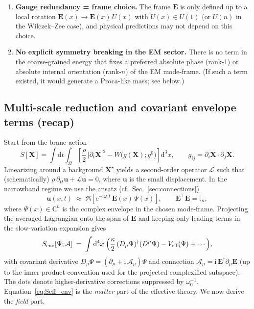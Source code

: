 \documentclass[11pt,a4paper]{article}
\newcommand{\C}{\mathbb{C}}
\providecommand{\dd}{\mathrm{d}}
\providecommand{\ii}{\mathrm{i}}
\providecommand{\e}{\mathrm{e}}
\newcommand{\X}{\mathbf{X}}                 %
\newcommand{\uvec}{\mathbf{u}}              %
\newcommand{\bbA}{\mathcal{A}}              %
\begin{document}
\begin{enumerate}
  \item \textbf{Gauge redundancy = frame choice.} The frame \(\mathbf{E}\) is only defined up to a local rotation
        \(\mathbf{E}(x)\to \mathbf{E}(x)\,U(x)\) with \(U(x)\in U(1)\) (or \(U(n)\) in the Wilczek--Zee case),
        and physical predictions may not depend on this choice.
  \item \textbf{No explicit symmetry breaking in the EM sector.} There is no term in the coarse-grained energy that fixes a preferred
        absolute phase (rank-1) or absolute internal orientation (rank-\(n\)) of the EM mode-frame. (If such a term existed, it would generate
        a Proca-like mass; see below.)
\end{enumerate}

\subsection{Multi-scale reduction and covariant envelope terms (recap)}
Start from the brane action
\[
S[\X]=\int \dd t \int_{\Omega}\!\left[\frac{\rho}{2}\,|\partial_t\X|^2 - W\!\big(g(\X);g^0\big)\right]\dd^3x,
\qquad g_{ij}=\partial_i\X\cdot\partial_j\X.
\]
Linearizing around a background \(\X^\star\) yields a second-order operator \(\mathcal{L}\) such that (schematically)
\(\rho\,\partial_{tt}\uvec + \mathcal{L}\uvec = 0\), where \(\uvec\) is the small displacement.
In the narrowband regime we use the ansatz (cf.~Sec.~\ref{sec:connections})
\begin{equation}
\uvec(x,t)\;\approx\;\Re\!\left[\e^{-\ii\omega_0 t}\,\mathbf{E}(x)\,\Psi(x)\right],
\qquad
\mathbf{E}^\top\mathbf{E}=\mathbb{I}_n,
\label{eq:narrowband_ansatz}
\end{equation}
where \(\Psi(x)\in\C^n\) is the complex envelope in the chosen mode-frame.
Projecting the averaged Lagrangian onto the span of \(\mathbf{E}\) and keeping only leading terms in the slow-variation expansion gives
\begin{equation}
S_{\rm env}[\Psi;\bbA]\;=\;\int \dd^4x\;\Big(
\frac{\kappa}{2}\,(D_\mu\Psi)^\dagger (D^\mu\Psi) - V_{\rm eff}(\Psi)
+\cdots\Big),
\label{eq:Seff_env}
\end{equation}
with covariant derivative
\(
D_\mu\Psi = (\partial_\mu + \ii\,\bbA_\mu)\Psi
\)
and connection
\(
\bbA_\mu = \ii\,\mathbf{E}^\dagger\partial_\mu \mathbf{E}
\)
(up to the inner-product convention used for the projected complexified subspace).
The dots denote higher-derivative corrections suppressed by \(\omega_0^{-1}\).
Equation~\eqref{eq:Seff_env} is the \emph{matter} part of the effective theory. We now derive the \emph{field} part.
\end{document}
